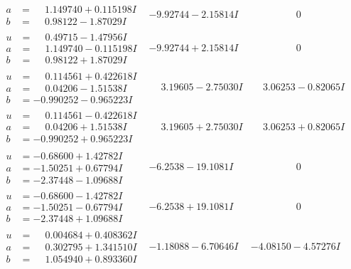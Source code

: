\documentclass[1p]{elsarticle_modified}
\theoremstyle{definition}
\begin{document}
$$\begin{array}{c|c|c}
\begin{aligned}
a &= \phantom{-}1.149740 + 0.115198 I \\
b &= \phantom{-}0.98122 - 1.87029 I\end{aligned}
 & -9.92744 - 2.15814 I & \phantom{-0.000000 } 0 \\ \hline\begin{aligned}
u &= \phantom{-}0.49715 - 1.47956 I \\
a &= \phantom{-}1.149740 - 0.115198 I \\
b &= \phantom{-}0.98122 + 1.87029 I\end{aligned}
 & -9.92744 + 2.15814 I & \phantom{-0.000000 } 0 \\ \hline\begin{aligned}
u &= \phantom{-}0.114561 + 0.422618 I \\
a &= \phantom{-}0.04206 - 1.51538 I \\
b &= -0.990252 - 0.965223 I\end{aligned}
 & \phantom{-}3.19605 - 2.75030 I & \phantom{-}3.06253 - 0.82065 I \\ \hline\begin{aligned}
u &= \phantom{-}0.114561 - 0.422618 I \\
a &= \phantom{-}0.04206 + 1.51538 I \\
b &= -0.990252 + 0.965223 I\end{aligned}
 & \phantom{-}3.19605 + 2.75030 I & \phantom{-}3.06253 + 0.82065 I \\ \hline\begin{aligned}
u &= -0.68600 + 1.42782 I \\
a &= -1.50251 + 0.67794 I \\
b &= -2.37448 - 1.09688 I\end{aligned}
 & -6.2538 - 19.1081 I & \phantom{-0.000000 } 0 \\ \hline\begin{aligned}
u &= -0.68600 - 1.42782 I \\
a &= -1.50251 - 0.67794 I \\
b &= -2.37448 + 1.09688 I\end{aligned}
 & -6.2538 + 19.1081 I & \phantom{-0.000000 } 0 \\ \hline\begin{aligned}
u &= \phantom{-}0.004684 + 0.408362 I \\
a &= \phantom{-}0.302795 + 1.341510 I \\
b &= \phantom{-}1.054940 + 0.893360 I\end{aligned}
 & -1.18088 - 6.70646 I & -4.08150 - 4.57276 I\\

\end{array}$$
\end{document}
